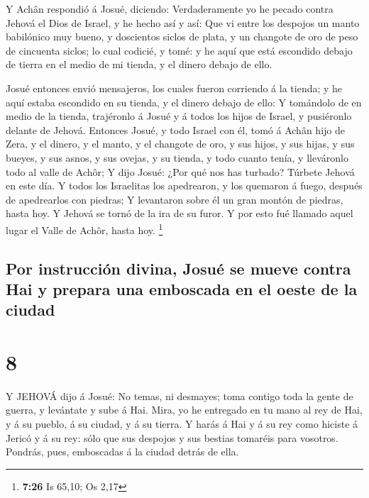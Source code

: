  Y Achân respondió á Josué, diciendo: Verdaderamente yo he
pecado contra Jehová el Dios de Israel, y he hecho así y así:
 Que vi entre los despojos un manto babilónico muy bueno, y
doscientos siclos de plata, y un changote de oro de peso de cincuenta
siclos; lo cual codicié, y tomé: y he aquí que está escondido debajo de
tierra en el medio de mi tienda, y el dinero debajo de ello.

 Josué entonces envió mensajeros, los cuales fueron
corriendo á la tienda; y he aquí estaba escondido en su tienda, y el
dinero debajo de ello:  Y tomándolo de en medio de la
tienda, trajéronlo á Josué y á todos los hijos de Israel, y pusiéronlo
delante de Jehová.  Entonces Josué, y todo Israel con él,
tomó á Achân hijo de Zera, y el dinero, y el manto, y el changote de
oro, y sus hijos, y sus hijas, y sus bueyes, y sus asnos, y sus ovejas,
y su tienda, y todo cuanto tenía, y lleváronlo todo al valle de Achôr;
 Y dijo Josué: ¿Por qué nos has turbado? Túrbete Jehová en
este día. Y todos los Israelitas los apedrearon, y los quemaron á fuego,
después de apedrearlos con piedras;  Y levantaron sobre él
un gran montón de piedras, hasta hoy. Y Jehová se tornó de la ira de su
furor. Y por esto fué llamado aquel lugar el Valle de Achôr, hasta hoy.
\footnote{\textbf{7:26} Is 65,10; Os 2,17}

\hypertarget{por-instrucciuxf3n-divina-josuuxe9-se-mueve-contra-hai-y-prepara-una-emboscada-en-el-oeste-de-la-ciudad}{%
\subsection{Por instrucción divina, Josué se mueve contra Hai y prepara
una emboscada en el oeste de la
ciudad}\label{por-instrucciuxf3n-divina-josuuxe9-se-mueve-contra-hai-y-prepara-una-emboscada-en-el-oeste-de-la-ciudad}}

\hypertarget{section-7}{%
\section{8}\label{section-7}}

 Y JEHOVÁ dijo á Josué: No temas, ni desmayes; toma contigo
toda la gente de guerra, y levántate y sube á Hai. Mira, yo he entregado
en tu mano al rey de Hai, y á su pueblo, á su ciudad, y á su tierra.
 Y harás á Hai y á su rey como hiciste á Jericó y á su rey:
sólo que sus despojos y sus bestias tomaréis para vosotros. Pondrás,
pues, emboscadas á la ciudad detrás de ella.

